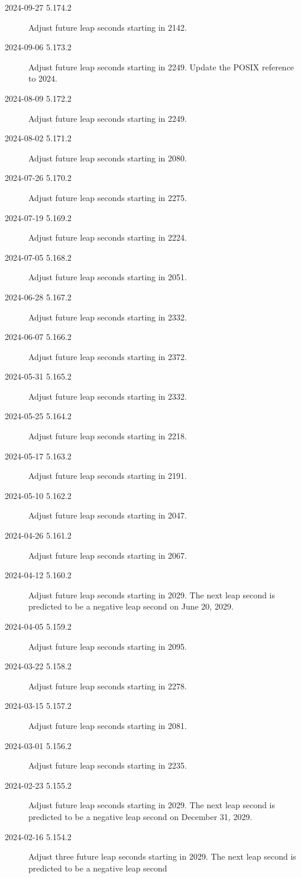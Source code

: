 \documentclass[letterpaper,twoside]{article}
\begin{document}
\begin{description}
\item[2024-09-27 5.174.2]Adjust future leap seconds starting in 2142.
\item[2024-09-06 5.173.2]Adjust future leap seconds starting in 2249.
  Update the POSIX reference to 2024.
\item[2024-08-09 5.172.2]Adjust future leap seconds starting in 2249.
\item[2024-08-02 5.171.2]Adjust future leap seconds starting in 2080.
\item[2024-07-26 5.170.2]Adjust future leap seconds starting in 2275.
\item[2024-07-19 5.169.2]Adjust future leap seconds starting in 2224.
\item[2024-07-05 5.168.2]Adjust future leap seconds starting in 2051.
\item[2024-06-28 5.167.2]Adjust future leap seconds starting in 2332.
\item[2024-06-07 5.166.2]Adjust future leap seconds starting in 2372.
\item[2024-05-31 5.165.2]Adjust future leap seconds starting in 2332.
\item[2024-05-25 5.164.2]Adjust future leap seconds starting in 2218.
\item[2024-05-17 5.163.2]Adjust future leap seconds starting in 2191.
\item[2024-05-10 5.162.2]Adjust future leap seconds starting in 2047.
\item[2024-04-26 5.161.2]Adjust future leap seconds starting in 2067.
\item[2024-04-12 5.160.2]Adjust future leap seconds starting in 2029.
  The next leap second is predicted to be a negative leap second
  on June 20, 2029.
\item[2024-04-05 5.159.2]Adjust future leap seconds starting in 2095.
\item[2024-03-22 5.158.2]Adjust future leap seconds starting in 2278.
\item[2024-03-15 5.157.2]Adjust future leap seconds starting in 2081.
\item[2024-03-01 5.156.2]Adjust future leap seconds starting in 2235.
\item[2024-02-23 5.155.2]Adjust future leap seconds starting in 2029.
  The next leap second is predicted to be a negative leap second
  on December 31, 2029.
\item[2024-02-16 5.154.2]Adjust three future leap seconds starting in 2029.
  The next leap second is predicted to be a negative leap second

\end{description}
\end{document}
